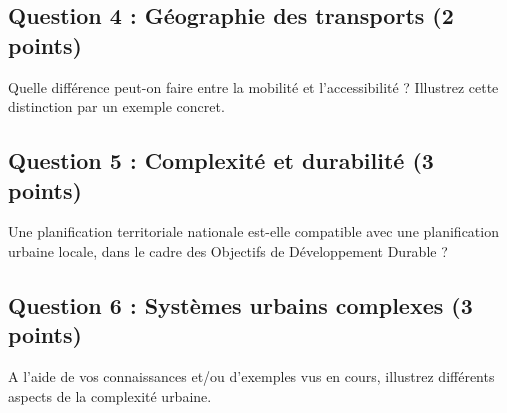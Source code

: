 \documentclass[
]{article}
\begin{document}
\framebox[\textwidth]{\rule{0pt}{10cm}}



\newpage


\subsection{Question 4 : Géographie des transports (2 points)} %

Quelle différence peut-on faire entre la mobilité et l'accessibilité ? Illustrez cette distinction par un exemple concret.

\framebox[\textwidth]{\rule{0pt}{10cm}}

\medskip


\subsection{Question 5 : Complexité et durabilité (3 points)} %

Une planification territoriale nationale est-elle compatible avec une planification urbaine locale, dans le cadre des Objectifs de Développement Durable ?

\framebox[\textwidth]{\rule{0pt}{10cm}}



\newpage


\subsection{Question 6 : Systèmes urbains complexes (3 points)} %

A l'aide de vos connaissances et/ou d'exemples vus en cours, illustrez différents aspects de la complexité urbaine.

\framebox[\textwidth]{\rule{0pt}{10cm}}
\end{document}
